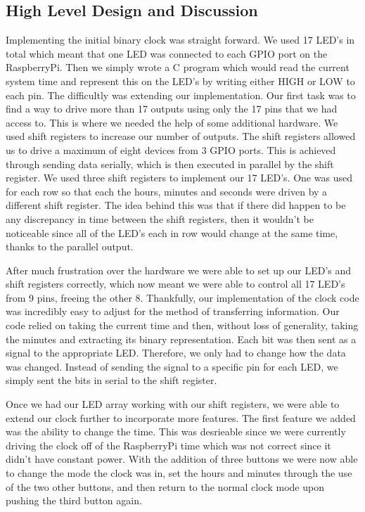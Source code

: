 \documentclass[11pt]{article}
\begin{document}
\subsection{High Level Design and Discussion}
Implementing the initial binary clock was straight forward. We used 17 LED’s in total which meant that one LED was connected to each GPIO port on the RaspberryPi. Then we simply wrote a C program which would read the current system time and represent this on the LED’s by writing either HIGH or LOW to each pin. The difficultly was extending our implementation. Our first task was to find a way to drive more than 17 outputs using only the 17 pins that we had access to. This is where we needed the help of some additional hardware. We used shift registers to increase our number of outputs. The shift registers allowed us to drive a maximum of eight devices from 3 GPIO ports. This is achieved through sending data serially, which is then executed in parallel by the shift register. We used three shift registers to implement our 17 LED’s. One was used for each row so that each the hours, minutes and seconds were driven by a different shift register. The idea behind this was that if there did happen to be any discrepancy in time between the shift registers, then it wouldn’t be noticeable since all of the LED’s each in row would change at the same time, thanks to the parallel output. \par

After much frustration over the hardware we were able to set up our LED’s and shift registers correctly, which now meant we were able to control all 17 LED’s from 9 pins, freeing the other 8. Thankfully, our implementation of the clock code was incredibly easy to adjust for the method of transferring information. Our code relied on taking the current time and then, without loss of generality, taking the minutes and extracting its binary representation. Each bit was then sent as a signal to the appropriate LED. Therefore, we only had to change how the data was changed. Instead of sending the signal to a specific pin for each LED, we simply sent the bits in serial to the shift register. \par

Once we had our LED array working with our shift registers, we were able to extend our clock further to incorporate more features. The first feature we added was the ability to change the time. This was desrieable since we were currently driving the clock off of the RaspberryPi time which was not correct since it didn't have constant power. With the addition of three buttons we were now able to change the mode the clock was in, set the hours and minutes through the use of the two other buttons, and then return to the normal clock mode upon pushing the third button again. \par
\end{document}
